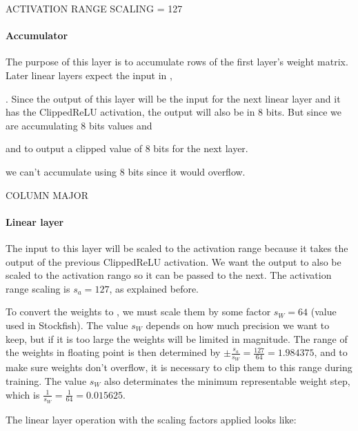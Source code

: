 ACTIVATION RANGE SCALING = 127


\paragraph[short]{Accumulator} The purpose of this layer is to accumulate rows of the first layer's weight matrix. Later linear layers expect the input in , 


. Since the output of this layer will be the input for the next linear layer and it has the ClippedReLU activation, the output will also be in 8 bits.
But since we are accumulating 8 bits values and


and to output a clipped value of 8 bits for the next layer.

we can't accumulate using 8 bits since it would overflow.

COLUMN MAJOR

\paragraph[short]{Linear layer}
The input to this layer will be scaled to the activation range because it takes the output of the previous ClippedReLU activation. We want the output to also be scaled to the activation rango so it can be passed to the next. The activation range scaling is $s_a=127$, as explained before.

To convert the weights to , we must scale them by some factor $s_W=64$ (value used in Stockfish). The value $s_W$ depends on how much precision we want to keep, but if it is too large the weights will be limited in magnitude. The range of the weights in floating point is then determined by $\pm \frac{s_a}{s_W}=\frac{127}{64}=1.984375$, and to make sure weights don't overflow, it is necessary to clip them to this range during training. The value $s_W$ also determinates the minimum representable weight step, which is $\frac{1}{s_W}=\frac{1}{64}=0.015625$.

The linear layer operation with the scaling factors applied looks like:

